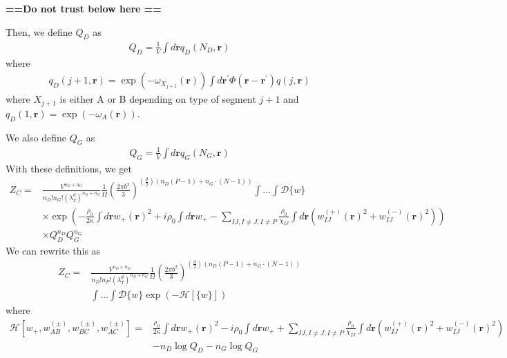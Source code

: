 \documentclass{article}
\begin{document}
\textbf{==Do not trust below here ==}

Then, we define $Q_D$ as
\begin{align*}
  Q_D = \frac{1}{V} \int d\mathbf{r} q_D (N_D, \mathbf{r})
\end{align*}
where
\begin{align*}
  q_D(j+1, \mathbf{r}) = \exp(-\omega_{X_{j+1}}(\mathbf{r}))
    \int d \mathbf{r}^\prime \Phi(\mathbf{r} - \mathbf{r}^\prime)
    q(j, \mathbf{r})  
\end{align*}
where $X_{j+1}$ is either A or B depending on type of segment $j+1$
  and $q_D(1, \mathbf{r}) = \exp(-\omega_A(\mathbf{r}))$.

  We also define $Q_G$ as
  \begin{align}
    Q_G = \frac{1}{V}  \int d \mathbf{r}{q_G} (N_G, \mathbf{r})
  \end{align}
With these definitions, we get
\begin{align*}
  Z_C =& \frac{V^{n_D+n_G}}
              {n_D!n_G! \left( \lambda_T^d \right)^{n_D+n_G}}
    \frac{1}{\Omega}
    \left( \frac{2\pi b^2}{3} \right)
    ^ {(\frac{d}{2}) (n_D (P-1) + n_G \cdot (N-1) )  }
    \int \hdots \int \mathcal{D} \{w\} \\
    &\times \exp \left(
      - \frac{\rho_0}{2\kappa} \int d \mathbf{r} w_+(\mathbf{r})^2
      + i \rho_0 \int d\mathbf{r} w_+
      - \sum_{IJ,I \ne J, I \ne P}
      \frac{\rho_0}{\chi_{IJ}}
      \int d \mathbf{r}
      \left(
        w_{IJ}^{(+)} (\mathbf{r})^2 + w_{IJ}^{(-)} (\mathbf{r})^2
      \right)
    \right) \\
    &\times Q_D^{n_D} Q_G^{n_G}
\end{align*}
We can rewrite this as
\begin{align*}
  Z_C =& \frac{V^{n_D+n_G}}
              {n_D!n_P! \left( \lambda_T^d \right)^{n_D+n_G}}
    \frac{1}{\Omega}
    \left( \frac{2\pi b^2}{3} \right)
    ^ {(\frac{d}{2}) (n_D (P-1) + n_G \cdot (N-1) )  }
    \\
    &\int \hdots \int \mathcal{D} \{w\}
    \exp \left(
      -\mathcal{H}[\{w\}]
    \right)
\end{align*}
where
\begin{align*}
  \mathcal{H}[w_+, w_{AB}^{(\pm)},w_{BC}^{(\pm)},w_{AC}^{(\pm)}] =&
    \frac{\rho_0}{2\kappa} \int d \mathbf{r} w_+(\mathbf{r})^2
    - i \rho_0 \int d\mathbf{r} w_+
    + \sum_{IJ,I \ne J, I \ne P}
    \frac{\rho_0}{\chi_{IJ}}
    \int d \mathbf{r}
    \left(
      w_{IJ}^{(+)} (\mathbf{r})^2 + w_{IJ}^{(-)} (\mathbf{r})^2
    \right) \\
    &- n_D \log Q_D - n_G \log Q_G
\end{align*}
\end{document}

